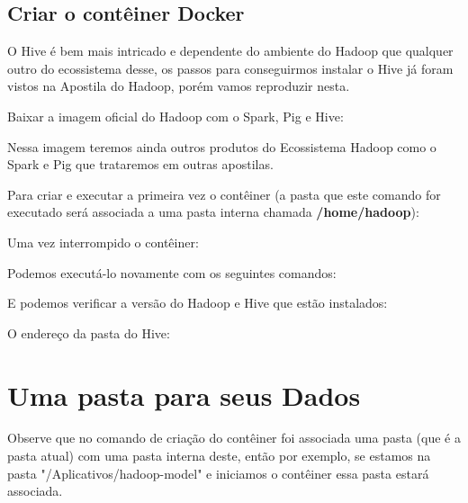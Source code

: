 \documentclass[a4paper,11pt]{article}
\begin{document}
\subsection{Criar o contêiner Docker}
O Hive é bem mais intricado e dependente do ambiente do Hadoop que qualquer outro do ecossistema desse, os passos para conseguirmos instalar o Hive já foram vistos na Apostila do Hadoop, porém vamos reproduzir nesta.

Baixar a imagem oficial do Hadoop com o Spark, Pig e Hive: \\

Nessa imagem teremos ainda outros produtos do Ecossistema Hadoop como o Spark e Pig que trataremos em outras apostilas.

Para criar e executar a primeira vez o contêiner (a pasta que este comando for executado será associada a uma pasta interna chamada \textbf{/home/hadoop}): \\

Uma vez interrompido o contêiner: \\

Podemos executá-lo novamente com os seguintes comandos: \\

E podemos verificar a versão do Hadoop e Hive que estão instalados: \\

O endereço da pasta do Hive: \\

\section{Uma pasta para seus Dados}
Observe que no comando de criação do contêiner foi associada uma pasta (que é a pasta atual) com uma pasta interna deste, então por exemplo, se estamos na pasta "/Aplicativos/hadoop-model" e iniciamos o contêiner essa pasta estará associada.
\end{document}
